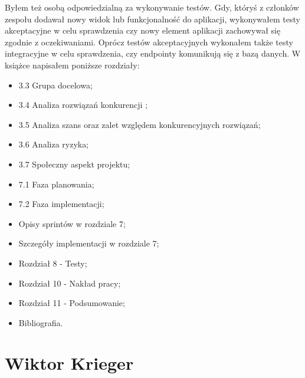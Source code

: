 Byłem też osobą odpowiedzialną za wykonywanie testów. Gdy, któryś z członków zespołu dodawał nowy widok lub funkcjonalność do aplikacji, wykonywałem testy akceptacyjne w celu sprawdzenia czy nowy element aplikacji zachowywał się zgodnie z oczekiwaniami. Oprócz testów akceptacyjnych wykonałem także testy integracyjne w celu sprawdzenia, czy endpointy komunikują się z bazą danych. W książce napisałem poniższe rozdziały:


\begin{itemize}
    \item 3.3 Grupa docelowa;
    \item 3.4 Analiza rozwiązań konkurencji ;
    \item 3.5 Analiza szans oraz zalet względem konkurencyjnych rozwiązań;
    \item 3.6 Analiza ryzyka;
    \item 3.7 Społeczny aspekt projektu;
    \item 7.1 Faza planowania;
    \item 7.2 Faza implementacji;
    \item Opisy sprintów w rozdziale 7;
    \item Szczegóły implementacji w rozdziale 7;
    \item Rozdział 8 - Testy;
    \item Rozdział 10 - Nakład pracy;
    \item Rozdział 11 - Podsumowanie;
    \item Bibliografia.
\end{itemize}

\section{Wiktor Krieger}

